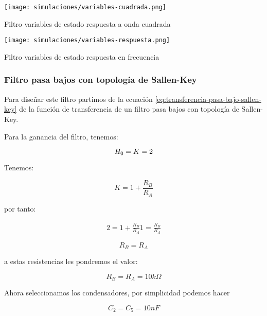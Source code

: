 \begin{ilustracion}[ht]
    \centering
    \texttt{[image: simulaciones/variables-cuadrada.png]}
    \caption{Filtro variables de estado respuesta a onda cuadrada  }
    \label{ilus:sim-variables-cuadrada} 
\end{ilustracion}

\begin{ilustracion}[ht]
    \centering
    \texttt{[image: simulaciones/variables-respuesta.png]}
    \caption{Filtro variables de estado respuesta en frecuencia  }
\end{ilustracion}

\FloatBarrier
\subsubsection{Filtro pasa bajos con topología de Sallen-Key}

Para diseñar este filtro partimos de la ecuación \ref{eq:transferencia-pasa-bajo-sallen-key} de la función de transferencia de un filtro pasa bajos con topología de Sallen-Key.

Para la ganancia del filtro, tenemos:

\begin{equation*}
    H_0 = K = 2
\end{equation*}

Tenemos:

\begin{equation}
    K = 1 + \frac{R_B}{R_A}
\end{equation}

por tanto:

\begin{align*}
    2 = 1 + \frac{R_B}{R_A}
    1 = \frac{R_B}{R_A}
\end{align*}

\begin{equation*}
    \boxed{R_B = R_A}
\end{equation*}

a estas resistencias les pondremos el valor:

\begin{equation*}
    \boxed{R_B = R_A = 10k\Omega}
\end{equation*}

Ahora seleccionamos los condensadores, por simplicidad podemos hacer

\begin{equation*}
    \boxed{C_2 = C_5 = 10nF}
\end{equation*}

